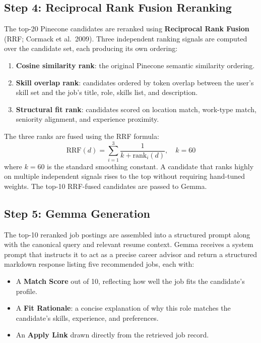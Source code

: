 \documentclass[11pt]{article}
\begin{document}
\subsection{Step 4: Reciprocal Rank Fusion Reranking}

The top-20 Pinecone candidates are reranked using \textbf{Reciprocal Rank Fusion} (RRF; Cormack et al.\ 2009). Three independent ranking signals are computed over the candidate set, each producing its own ordering:

\begin{enumerate}
  \item \textbf{Cosine similarity rank}: the original Pinecone semantic similarity ordering.
  \item \textbf{Skill overlap rank}: candidates ordered by token overlap between the user's skill set and the job's title, role, skills list, and description.
  \item \textbf{Structural fit rank}: candidates scored on location match, work-type match, seniority alignment, and experience proximity.
\end{enumerate}

The three ranks are fused using the RRF formula:
\[
  \text{RRF}(d) = \sum_{i=1}^{3} \frac{1}{k + \text{rank}_i(d)}, \quad k = 60
\]
where $k=60$ is the standard smoothing constant. A candidate that ranks highly on multiple independent signals rises to the top without requiring hand-tuned weights. The top-10 RRF-fused candidates are passed to Gemma.

\subsection{Step 5: Gemma Generation}

The top-10 reranked job postings are assembled into a structured prompt along with the canonical query and relevant resume context. Gemma receives a system prompt that instructs it to act as a precise career advisor and return a structured markdown response listing five recommended jobs, each with:

\begin{itemize}
  \item A \textbf{Match Score} out of 10, reflecting how well the job fits the candidate's profile.
  \item A \textbf{Fit Rationale}: a concise explanation of why this role matches the candidate's skills, experience, and preferences.
  \item An \textbf{Apply Link} drawn directly from the retrieved job record.
\end{itemize}
\end{document}
